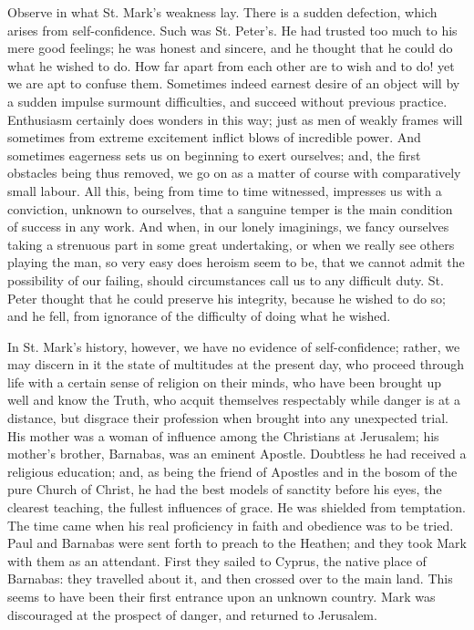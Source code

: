 Observe in what St. Mark's weakness lay. There is a sudden defection,
which arises from self-confidence. Such was St. Peter's. He had trusted
too much to his mere good feelings; he was honest and sincere, and he
thought that he could do what he wished to do. How far apart from each
other are to wish and to do! yet we are apt to confuse them. Sometimes
indeed earnest desire of an object will by a sudden impulse surmount
difficulties, and succeed without previous practice. Enthusiasm
certainly does wonders in this way; just as men of weakly frames will
sometimes from extreme excitement inflict blows of incredible power. And
sometimes eagerness sets us on beginning to exert ourselves; and, the
first obstacles being thus removed, we go on as a matter of course with
comparatively small labour. All this, being from time to time witnessed,
impresses us with a conviction, unknown to ourselves, that a sanguine
temper is the main condition of success in any work. And when, in our
lonely imaginings, we fancy ourselves taking a strenuous part in some
great undertaking, or when we really see others playing the man, so very
easy does heroism seem to be, that we cannot admit the possibility of
our failing, should circumstances call us to any difficult duty. St.
Peter thought that he could preserve his integrity, because he wished to
do so; and he fell, from ignorance of the difficulty of doing what he
wished.

In St. Mark's history, however, we have no evidence of
self-confidence; rather, we may discern in it the state of multitudes at
the present day, who proceed through life with a certain sense of
religion on their minds, who have been brought up well and know the
Truth, who acquit themselves respectably while danger is at a distance,
but disgrace their profession when brought into any unexpected trial.
His mother was a woman of influence among the Christians at Jerusalem;
his mother's brother, Barnabas, was an eminent Apostle. Doubtless he had
received a religious education; and, as being the friend of Apostles and
in the bosom of the pure Church of Christ, he had the best models of
sanctity before his eyes, the clearest teaching, the fullest influences
of grace. He was shielded from temptation. The time came when his real
proficiency in faith and obedience was to be tried. Paul and Barnabas
were sent forth to preach to the Heathen; and they took Mark with them
as an attendant. First they sailed to Cyprus, the native place of
Barnabas: they travelled about it, and then crossed over to the main
land. This seems to have been their first entrance upon an unknown
country. Mark was discouraged at the prospect of danger, and returned to
Jerusalem.


